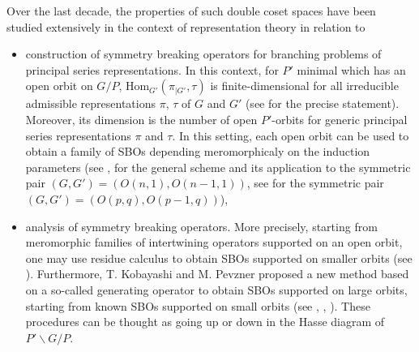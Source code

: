 \documentclass[pdftex]{sigma}
\numberwithin{equation}{section}
\theoremstyle{definition}
\newcommand{\Hom}{\mathrm{Hom}}
\theoremstyle{plain}
\theoremstyle{plain}
\theoremstyle{plain}
\theoremstyle{plain}
\begin{document}
Over the last decade, the properties of such double coset spaces have been studied extensively in the context of representation theory in relation to

\begin{itemize}[leftmargin=*, label = --, noitemsep, nolistsep]
	
	\item construction of symmetry breaking operators for branching problems of principal series representations. In this context, for $P'$ minimal which has an open orbit on $G/P$, $\Hom_{G'}(\pi_{|G'},\tau)$ is finite-dimensional for all irreducible admissible representations $\pi$, $\tau$ of $G$ and $G'$ (see \cite{KobayashiOshima} for the precise statement). Moreover, its dimension is the number of open $P'$-orbits for generic principal series representations $\pi$ and $\tau$. In this setting, each open orbit can be used to obtain a family of SBOs depending meromorphicaly on the induction parameters (see \cite{KobayashiSpeh}, \cite{KobayashiSpeh2} for the general scheme and its application to the symmetric pair $(G,G') = (O(n,1),O(n-1,1))$, see \cite{Leontiev} for the symmetric pair $(G,G') = (O(p,q),O(p-1,q))$),
	
	\item analysis of symmetry breaking operators. More precisely, starting from meromorphic families of intertwining operators supported on an open orbit, one may use residue calculus to obtain SBOs supported on smaller orbits (see \cite{KobayashiSpeh}). Furthermore, T. Kobayashi and M. Pevzner proposed a new method based on a so-called generating operator to obtain SBOs supported on large orbits, starting from known SBOs supported on small orbits (see \cite{normal_derivatives}, \cite{Generating_Rankin_Cohen}, \cite{discretetocontinuous}). These procedures can be thought as going up or down in the Hasse diagram of $P'\backslash G/P$.
	

\end{itemize}
\end{document}
